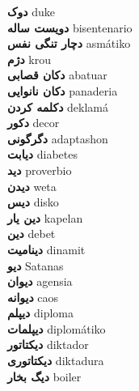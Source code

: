 \textbf{ دوک  } duke \\
\textbf{ دویست ساله  } bisentenario \\
\textbf{ دچار تنگی نفس  } asmátiko \\
\textbf{ دژم  } krou \\
\textbf{ دکان قصابی  } abatuar \\
\textbf{ دکان نانوایی  } panaderia \\
\textbf{ دکلمه کردن  } deklamá \\
\textbf{ دکور  } decor \\
\textbf{ دگرگونی  } adaptashon \\
\textbf{ دیابت  } diabetes \\
\textbf{ دید  } proverbio \\
\textbf{ دیدن  } weta \\
\textbf{ دیس  } disko \\
\textbf{ دین یار  } kapelan \\
\textbf{ دین  } debet \\
\textbf{ دینامیت  } dinamit \\
\textbf{ دیو  } Satanas \\
\textbf{ دیوان  } agensia \\
\textbf{ دیوانه  } caos \\
\textbf{ دیپلم  } diploma \\
\textbf{ دیپلمات  } diplomátiko \\
\textbf{ دیکتاتور  } diktador \\
\textbf{ دیکتاتوری  } diktadura \\
\textbf{ دیگ بخار  } boiler \\
